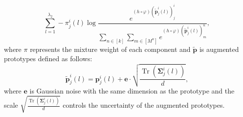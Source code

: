 \documentclass{article}
\theoremstyle{plain}
\theoremstyle{definition}
\theoremstyle{remark}
\begin{document}
\begin{equation}
\label{eq10}
 \sum_{l=1}^{\lambda_{2}}  - \pi_{j}^{i} (l) \log \frac{e ^{ \left(h \circ \varphi\right)(\widetilde{\boldsymbol{p}}^{i}_{j}(l))_{j}^{i}}  }{\sum\limits_{n \in [k]} \sum\limits_{m \in [M^{n}]} e^ { \left(h \circ \varphi\right)(\widetilde{\boldsymbol{p}}^{i}_{j} (l))_{m}^{n}}},
\end{equation}
where $\pi$ represents the mixture weight of each component and $\widetilde{\boldsymbol{p}}$ is augmented prototypes defined as follows:
\begin{equation}
    \widetilde{\boldsymbol{p}}_{j}^{i}(l) = \boldsymbol{p}_{j}^{i}(l) + \boldsymbol{e} \cdot\sqrt{\frac{\operatorname{Tr}\left(\boldsymbol{\Sigma} ^{i}_{j}(l)\right)}{d}},
\end{equation}
where $\boldsymbol{e}$ is Gaussian noise with the same dimension as the prototype and the scale $\sqrt{\frac{\operatorname{Tr}\left(\boldsymbol{\Sigma}^{i}_{j}(l)\right)}{d}}$  controls the uncertainty of the augmented prototypes.
\end{document}

